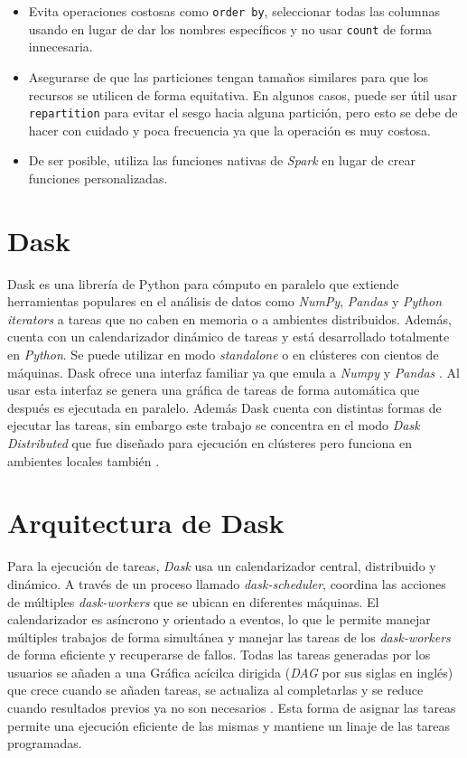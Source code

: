\begin{itemize}
	\item Evita operaciones costosas como \texttt{order by}, seleccionar todas las columnas usando \texttt{\*} en lugar de dar los nombres específicos y no usar \texttt{count} de forma innecesaria.
	\item Asegurarse de que las particiones tengan tamaños similares para que los recursos se utilicen de forma equitativa. En algunos casos, puede ser útil usar \texttt{repartition} para evitar el sesgo hacia alguna partición, pero esto se debe de hacer con cuidado y poca frecuencia ya que la operación es muy costosa.
	\item De ser posible, utiliza las funciones nativas de \textit{Spark} en lugar de crear funciones personalizadas.
	 	
\end{itemize}

\section{Dask}

Dask es una librería de Python para cómputo en paralelo que extiende herramientas populares en el análisis de datos como \textit{NumPy}, \textit{Pandas} y \textit{Python iterators} a tareas que no caben en memoria o a ambientes distribuidos. Además, cuenta con un calendarizador dinámico de tareas y está desarrollado totalmente en \textit{Python}. Se puede utilizar en modo \textit{standalone} o en clústeres con cientos de máquinas. Dask ofrece una interfaz familiar ya que emula a \textit{Numpy} y \textit{Pandas} \cite{daskdocs}. Al usar esta interfaz se genera una gráfica de tareas de forma automática que después es ejecutada en paralelo. Además Dask cuenta con distintas formas de ejecutar las tareas, sin embargo este trabajo se concentra en el modo \textit{Dask Distributed} que fue diseñado para ejecución en clústeres pero funciona en ambientes locales también \cite{daskscheduling}.

\section{Arquitectura de Dask}

Para la ejecución de tareas, \textit{Dask} usa un calendarizador central, distribuido y dinámico. A través de un proceso llamado \textit{dask-scheduler}, coordina las acciones de múltiples \textit{dask-workers} que se ubican en diferentes máquinas. El calendarizador es asíncrono y orientado a eventos, lo que le permite manejar múltiples trabajos de forma simultánea y manejar las tareas de los \textit{dask-workers} de forma eficiente y recuperarse de fallos. Todas las tareas generadas por los usuarios se añaden a una Gráfica acícilca dirigida (\textit{DAG} por sus siglas en inglés) que crece cuando se añaden tareas, se actualiza al completarlas y se reduce cuando resultados previos ya no son necesarios \cite{daskdistributed}. Esta forma de asignar las tareas permite una ejecución eficiente de las mismas y mantiene un linaje de las tareas programadas.


